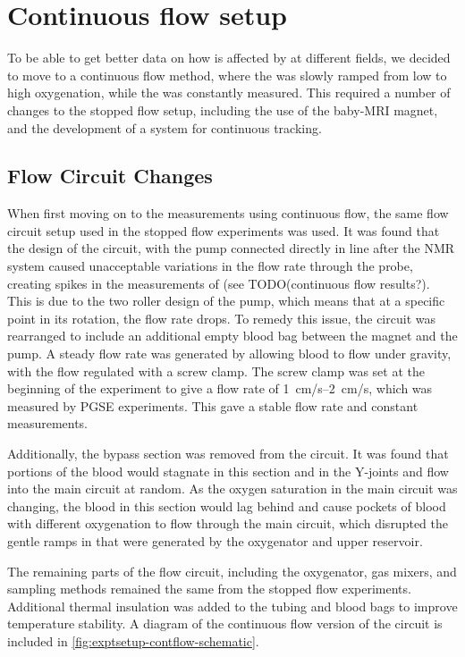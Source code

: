 \section{Continuous flow setup}
\label{sec:exptsetup-contflow}

To be able to get better data on how \Ttwo is affected by \SOtwo at different fields, we decided to move to a continuous flow method, where the \SOtwo was slowly ramped from low to high oxygenation, while the \Ttwo was constantly measured.
This required a number of changes to the stopped flow setup, including the use of the baby-MRI magnet, and the development of a system for continuous \SOtwo tracking.

\subsection{Flow Circuit Changes}
When first moving on to the measurements using continuous flow, the same flow circuit setup used in the stopped flow experiments was used.
It was found that the design of the circuit, with the pump connected directly in line after the NMR system caused unacceptable variations in the flow rate through the probe, creating spikes in the measurements of \Ttwo (see TODO(continuous flow results?).
This is due to the two roller design of the pump, which means that at a specific point in its rotation, the flow rate drops.
To remedy this issue, the circuit was rearranged to include an additional empty blood bag between the magnet and the pump.
A steady flow rate was generated by allowing blood to flow under gravity, with the flow regulated with a screw clamp.
The screw clamp was set at the beginning of the experiment to give a flow rate of \SIrange{1}{2}{cm/s}, which was measured by PGSE experiments.
This gave a stable flow rate and constant \Ttwo measurements.

Additionally, the bypass section was removed from the circuit.
It was found that portions of the blood would stagnate in this section and in the Y-joints and flow into the main circuit at random.
As the oxygen saturation in the main circuit was changing, the blood in this section would lag behind and cause pockets of blood with different oxygenation to flow through the main circuit, which disrupted the gentle ramps in \SOtwo that were generated by the oxygenator and upper reservoir.

The remaining parts of the flow circuit, including the oxygenator, gas mixers, and sampling methods remained the same from the stopped flow experiments.
Additional thermal insulation was added to the tubing and blood bags to improve temperature stability.
A diagram of the continuous flow version of the circuit is included in \autoref{fig:exptsetup-contflow-schematic}.

